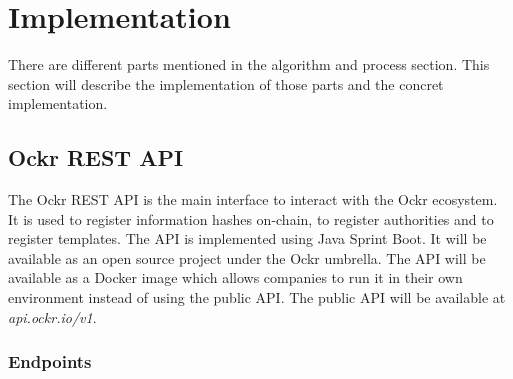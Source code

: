 \documentclass[../ockr-specification.tex]{subfiles}
\begin{document}
\section{Implementation}

There are different parts mentioned in the algorithm and process section. This section will describe the implementation of those parts and the concret implementation.

\subsection{Ockr REST API}

The Ockr REST API is the main interface to interact with the Ockr ecosystem. It is used to register information hashes on-chain, to register authorities and to register templates. The API is implemented using Java Sprint Boot. It will be available as an open source project under the Ockr umbrella. The API will be available as a Docker image which allows companies to run it in their own environment instead of using the public API. The public API will be available at \textit{api.ockr.io/v1}.

\subsubsection{Endpoints}
\end{document}
